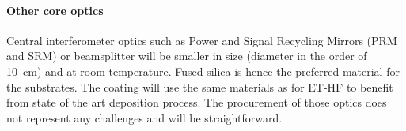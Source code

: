 





\paragraph{Other core optics}

Central interferometer optics such as Power and Signal Recycling Mirrors (PRM and SRM) or beamsplitter will be smaller in size (diameter in the order of 10~cm) and at room temperature. Fused silica is hence the preferred material for the substrates. The coating will use the same materials as for ET-HF to benefit from state of the art deposition process.  The procurement of those optics does not represent any challenges and will be straightforward.